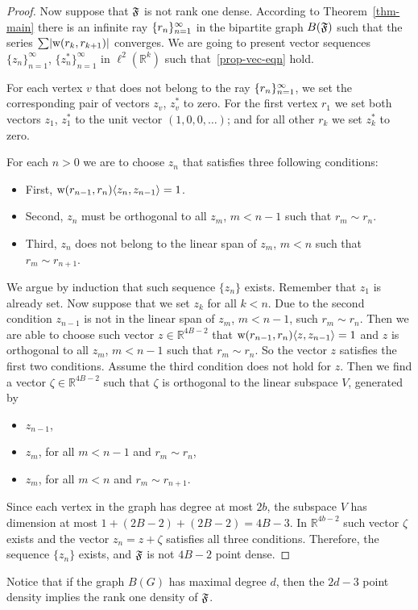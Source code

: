 \documentclass[12pt,oneside,a4paper]{amsart}
\begin{document}
\begin{proof}
        Now suppose that $\mathfrak{F}$ is not rank one dense.
        According to Theorem~\ref{thm-main} there is an infinite ray $\{{r}_n\}_{n=1}^\infty$ in the bipartite
          graph $B(\mathfrak{F})$ such that the series $\sum\lvert\mathrm{w}(r_k, r_{k+1})\rvert$ converges.
        We are going to present vector sequences $\{z_n\}_{n=1}^\infty$, $\{z^*_n\}_{n=1}^\infty$ in $\ell^2 (\mathbb{R}^k)$
          such that~\ref{prop-vec-eqn} hold.

        For each vertex $v$ that does not belong to the ray $\{{r}_n\}_{n=1}^\infty$, we set the corresponding pair of vectors $z_v$, $z^*_v$ to zero.
        For the first vertex $r_1$ we set both vectors $z_1$, $z^*_1$ to the unit vector $(1, 0, 0, \dots)$;
          and for all other $r_k$ we set $z^*_k$ to zero.

        For each $n > 0$ we are to choose $z_n$ that satisfies three following conditions:
        \begin{itemize}
          \item First, $\mathrm{w}(r_{n-1}, r_n)\langle z_n, z_{n - 1} \rangle = 1$.
          \item Second, $z_n$ must be orthogonal to all $z_m$, $m < n - 1$ such that $r_m \sim r_{n}$.
          \item Third, $z_n$ does not belong to the linear span of $z_m$, $m < n$ such that $r_m \sim r_{n + 1}$.
        \end{itemize}

        We argue by induction that such sequence $\{z_n\}$ exists.
        Remember that $z_1$ is already set.
        Now suppose that we set $z_k$ for all $k < n$.
        Due to the second condition $z_{n - 1}$ is not in the linear span of $z_m$, $m < n - 1$, such $r_m\sim r_n$.
        Then we are able to choose such vector $z \in \mathbb{R}^{4B - 2}$ that $\mathrm{w}(r_{n-1}, r_n) \langle z, z_{n-1} \rangle = 1$ and
          $z$ is orthogonal to all $z_m$, $m < n - 1$ such that $r_m\sim r_n$.
        So the vector $z$ satisfies the first two conditions.
        Assume the third condition does not hold for $z$.
        Then we find a vector $\zeta \in \mathbb{R}^{4B - 2}$ such that $\zeta$ is orthogonal to the linear subspace $V$, generated by
        \begin{itemize}
          \item $z_{n-1}$,
          \item $z_m$, for all $m < n - 1$ and $r_m\sim r_n$,
          \item $z_m$, for all $m < n$ and $r_m\sim r_{n + 1}$.
        \end{itemize}
        Since each vertex in the graph has degree at most $2b$, the subspace $V$ has dimension at most $1 + (2B - 2) + (2B - 2) = 4B - 3$.
        In $\mathbb{R}^{4b-2}$ such vector $\zeta$ exists and the vector $z_n = z + \zeta$ satisfies all three conditions.
        Therefore, the sequence $\{z_n\}$ exists, and $\mathfrak{F}$ is not $4B - 2$ point dense.
      \end{proof}
      \begin{remark}
        Notice that if the graph $B(G)$ has maximal degree $d$, then the $2d - 3$ point density implies the rank one density of $\mathfrak{F}$.
      \end{remark}
  \bigskip
\end{document}
